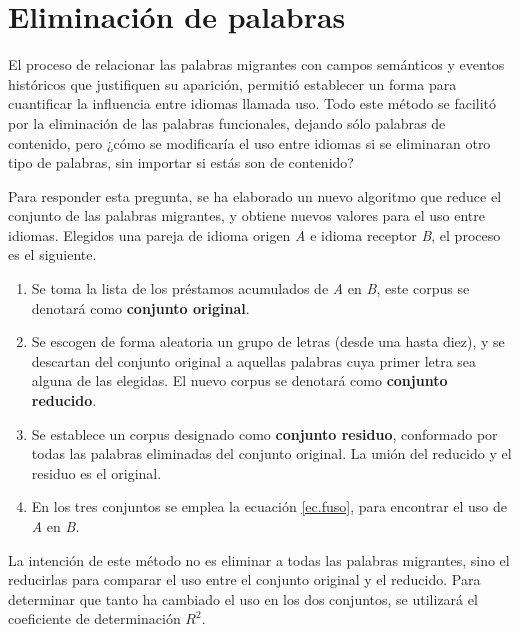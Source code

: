 \chapter{Eliminación de palabras}

El proceso de relacionar las palabras migrantes con campos semánticos y eventos históricos que justifiquen su aparición, permitió establecer un forma para cuantificar la influencia entre idiomas llamada uso. Todo este método se facilitó por la eliminación de las palabras funcionales, dejando sólo palabras de contenido, pero ¿cómo se modificaría el uso entre idiomas si se eliminaran otro tipo de palabras, sin importar si estás son de contenido?

Para responder esta pregunta, se ha elaborado un nuevo algoritmo que reduce el conjunto de las palabras migrantes, y  obtiene nuevos valores para el uso entre idiomas.  Elegidos una pareja de idioma origen \textit{A} e idioma receptor \textit{B}, el proceso es el siguiente. 


\begin{enumerate}
	
	\item Se toma la lista de los préstamos acumulados de \textit{A} en \textit{B},  este corpus se denotará como \textbf{conjunto original}.
	
	\item Se escogen de forma aleatoria un grupo de letras (desde una hasta diez), y se descartan del conjunto original a aquellas  palabras cuya primer letra sea alguna de las elegidas. El nuevo corpus se denotará como \textbf{conjunto reducido}.
	
	\item Se establece un corpus  designado como \textbf{conjunto residuo}, conformado por todas las palabras eliminadas del conjunto original.  La unión del reducido y el residuo es el original. 
	
	\item En los tres conjuntos se emplea la ecuación \ref{ec.fuso}, para encontrar el uso de \textit{A} en \textit{B}. 	
	
\end{enumerate}

La intención de este método  no es eliminar a todas las palabras migrantes, sino el reducirlas  para  comparar el uso entre el conjunto original y el reducido.  Para determinar que tanto ha cambiado el uso en los dos conjuntos, se utilizará el coeficiente de determinación $R^{2}$. 

